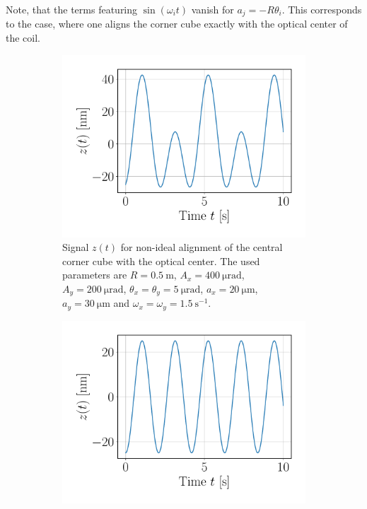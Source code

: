 \documentclass{report}
\numberwithin{tm}{section}
\begin{document}
Note, that the terms featuring $\sin(\omega_it)$ vanish for $a_j = -R\theta_i$. This corresponds to the case, where one aligns the corner cube exactly with the optical center of the coil.
\begin{figure}[h]
	\centering
	\begin{subfigure}{0.49\textwidth}
		\centering
		\includegraphics[width=\textwidth]{figures/z(t)_not_perfect.pdf}
		\caption{Signal $z(t)$ for non-ideal alignment of the central corner cube with the optical center. The used parameters are $R = \SI{0.5}{\meter}$, $A_x = \SI{400}{\micro\radian}$, $A_y = \SI{200}{\micro\radian}$, $\theta_x = \theta_y = \SI{5}{\micro\radian}$, $a_x = \SI{20}{\micro\meter}$, $a_y = \SI{30}{\micro\meter}$ and $\omega_x = \omega_y = \SI{1.5}{\second^{-1}}$.}
		\label{fig:z(t)_not_perfect}
	\end{subfigure}
	\hfill
	\begin{subfigure}{0.49\textwidth}
		\centering
		\includegraphics[width=\textwidth]{figures/z(t)_perfect.pdf}

\end{subfigure}
\end{figure}
\end{document}
